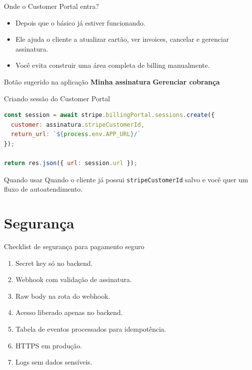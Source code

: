 \documentclass[aspectratio=169]{beamer}
\newcommand{\code}[1]{\texttt{#1}}
\begin{document}
\begin{frame}{Onde o Customer Portal entra?}
\begin{itemize}
  \item Depois que o básico já estiver funcionando.
  \item Ele ajuda o cliente a atualizar cartão, ver invoices, cancelar e gerenciar assinatura.
  \item Você evita construir uma área completa de billing manualmente.
\end{itemize}

\begin{block}{Botão sugerido na aplicação}
\textbf{Minha assinatura} \textrightarrow{} \textbf{Gerenciar cobrança}
\end{block}
\end{frame}

\begin{frame}[fragile]{Criando sessão do Customer Portal}
\begin{lstlisting}[language=JavaScript]
const session = await stripe.billingPortal.sessions.create({
  customer: assinatura.stripeCustomerId,
  return_url: `${process.env.APP_URL}/`
});

return res.json({ url: session.url });
\end{lstlisting}

\begin{exampleblock}{Quando usar}
Quando o cliente já possui \code{stripeCustomerId} salvo e você quer um fluxo de autoatendimento.
\end{exampleblock}
\end{frame}

\section{Segurança}

\begin{frame}{Checklist de segurança para pagamento seguro}
\begin{enumerate}
  \item Secret key só no backend.
  \item Webhook com validação de assinatura.
  \item Raw body na rota do webhook.
  \item Acesso liberado apenas no backend.
  \item Tabela de eventos processados para idempotência.
  \item HTTPS em produção.
  \item Logs sem dados sensíveis.
\end{enumerate}
\end{frame}
\end{document}
